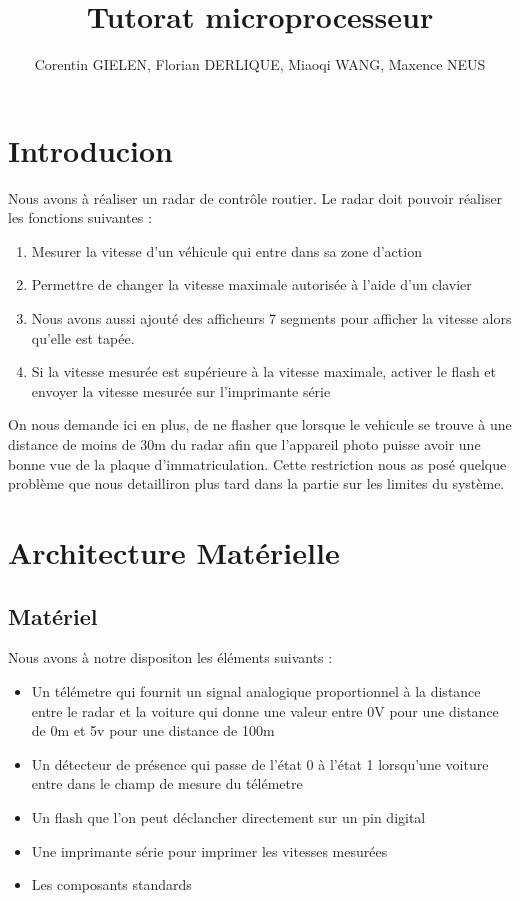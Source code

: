 \documentclass[a4paper, 12pt]{article}
\begin{document}
	\title{Tutorat microprocesseur}
	\author{Corentin GIELEN, Florian DERLIQUE, Miaoqi WANG, Maxence NEUS}
	\maketitle
	
	\newpage
	\tableofcontents
	\newpage
	
	\section{Introducion}
		Nous avons à réaliser un radar de contrôle routier.
		Le radar doit pouvoir réaliser les fonctions suivantes :
		\begin{enumerate}
			\item Mesurer la vitesse d'un véhicule qui entre dans sa zone d'action
			\item Permettre de changer la vitesse maximale autorisée à l'aide d'un clavier
			\item Nous avons aussi ajouté des afficheurs 7 segments pour afficher la vitesse alors qu'elle est tapée.
			\item Si la vitesse mesurée est supérieure à la vitesse maximale, activer le flash et envoyer la vitesse mesurée sur l'imprimante série
		\end{enumerate}
	
		On nous demande ici en plus, de ne flasher que lorsque le vehicule se trouve à une distance de moins de 30m du radar afin que l'appareil photo puisse avoir une bonne vue de la plaque d'immatriculation. Cette restriction nous as posé quelque problème que nous detailliron plus tard dans la partie sur les limites du système.
		
		
	\newpage
	\section{Architecture Matérielle}
		\subsection{Matériel}
		Nous avons à notre dispositon les éléments suivants :
		\begin{itemize}
			\item Un télémetre qui fournit un signal analogique proportionnel à la distance entre le radar et la voiture
			qui donne une valeur entre 0V pour une distance de 0m et 5v pour une distance de 100m
			\item Un détecteur de présence qui passe de l'état 0 à l'état 1 lorsqu'une voiture entre dans le champ de mesure du télémetre
			\item Un flash que l'on peut déclancher directement sur un pin digital
			\item Une imprimante série pour imprimer les vitesses mesurées
			\item Les composants standards
		\end{itemize}	
\end{document}
